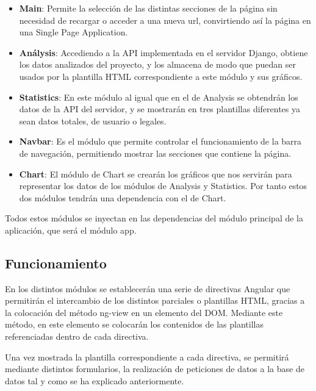 \documentclass[a4paper, spanish, 12pt]{book}
\begin{document}
\begin{itemize}

\item \textbf{Main}: Permite la selecci\'on de las distintas secciones de la p\'agina
sin necesidad de recargar o acceder a una nueva url, convirtiendo as\'i la p\'agina
en una Single Page Application.

\item \textbf{An\'alysis}: Accediendo a la API implementada en el servidor Django,
obtiene los datos analizados del proyecto, y los almacena de modo que puedan ser usados
por la plantilla HTML correspondiente a este m\'odulo y sus gr\'aficos.

\item \textbf{Statistics}: En este m\'odulo al igual que en el de Analysis se
obtendr\'an los datos de la API del servidor, y se mostrar\'an en tres plantillas
diferentes ya sean datos totales, de usuario o legales.

\item \textbf{Navbar}: Es el m\'odulo que permite controlar el funcionamiento de
la barra de navegaci\'on, permitiendo mostrar las secciones que contiene la p\'agina.

\item \textbf{Chart}: El m\'odulo de Chart se crear\'an los gr\'aficos que nos
servir\'an para representar los datos de los m\'odulos de Analysis y Statistics.
Por tanto estos dos m\'odulos tendr\'an una dependencia con el de Chart.

\end{itemize}

Todos estos m\'odulos se inyectan en las dependencias del m\'odulo principal de
la aplicaci\'on, que ser\'a el m\'odulo app.

\subsection{Funcionamiento}
\label{subsec:angular_funcionamiento}

En los distintos m\'odulos se establecer\'an una serie de directivas Angular
que permitir\'an el intercambio de los distintos parciales o plantillas HTML,
gracias a la colocaci\'on del m\'etodo ng-view en un elemento del DOM.
Mediante este m\'etodo, en este elemento se colocar\'an los contenidos de las
plantillas referenciadas dentro de cada directiva.

Una vez mostrada la plantilla correspondiente a cada directiva, se permitir\'a
mediante distintos formularios, la realizaci\'on de peticiones de datos a la base
de datos tal y como se ha explicado anteriormente.
\end{document}
